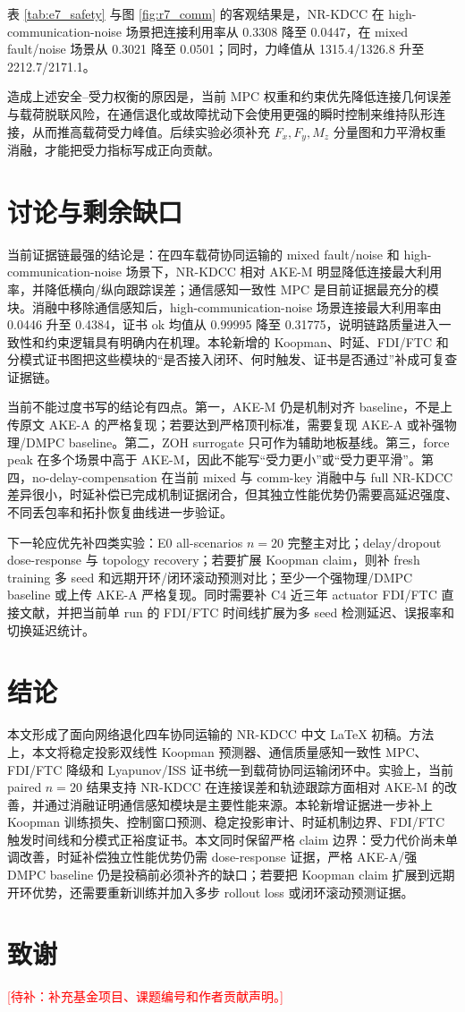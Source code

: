 \documentclass[twocolumn,3p,times,procedia]{elsarticle}
\newcommand{\todozh}[1]{\textcolor{red}{[待补：#1]}}
\newcommand{\AKE}{AKE-M}
\newcommand{\Method}{NR-KDCC}
\begin{document}
表 \ref{tab:e7_safety} 与图 \ref{fig:r7_comm} 的客观结果是，\Method{} 在 high-communication-noise 场景把连接利用率从 0.3308 降至 0.0447，在 mixed fault/noise 场景从 0.3021 降至 0.0501；同时，力峰值从 1315.4/1326.8 升至 2212.7/2171.1。

造成上述安全--受力权衡的原因是，当前 MPC 权重和约束优先降低连接几何误差与载荷脱联风险，在通信退化或故障扰动下会使用更强的瞬时控制来维持队形连接，从而推高载荷受力峰值。后续实验必须补充 $F_x,F_y,M_z$ 分量图和力平滑权重消融，才能把受力指标写成正向贡献。

\FloatBarrier

\section{讨论与剩余缺口}

当前证据链最强的结论是：在四车载荷协同运输的 mixed fault/noise 和 high-communication-noise 场景下，\Method{} 相对 \AKE{} 明显降低连接最大利用率，并降低横向/纵向跟踪误差；通信感知一致性 MPC 是目前证据最充分的模块。消融中移除通信感知后，high-communication-noise 场景连接最大利用率由 0.0446 升至 0.4384，证书 ok 均值从 0.99995 降至 0.31775，说明链路质量进入一致性和约束逻辑具有明确内在机理。本轮新增的 Koopman、时延、FDI/FTC 和分模式证书图把这些模块的“是否接入闭环、何时触发、证书是否通过”补成可复查证据链。

当前不能过度书写的结论有四点。第一，\AKE{} 仍是机制对齐 baseline，不是上传原文 AKE-A 的严格复现；若要达到严格顶刊标准，需要复现 AKE-A 或补强物理/DMPC baseline。第二，ZOH surrogate 只可作为辅助地板基线。第三，force peak 在多个场景中高于 \AKE{}，因此不能写“受力更小”或“受力更平滑”。第四，no-delay-compensation 在当前 mixed 与 comm-key 消融中与 full \Method{} 差异很小，时延补偿已完成机制证据闭合，但其独立性能优势仍需要高延迟强度、不同丢包率和拓扑恢复曲线进一步验证。

下一轮应优先补四类实验：E0 all-scenarios $n=20$ 完整主对比；delay/dropout dose-response 与 topology recovery；若要扩展 Koopman claim，则补 fresh training 多 seed 和远期开环/闭环滚动预测对比；至少一个强物理/DMPC baseline 或上传 AKE-A 严格复现。同时需要补 C4 近三年 actuator FDI/FTC 直接文献，并把当前单 run 的 FDI/FTC 时间线扩展为多 seed 检测延迟、误报率和切换延迟统计。

\section{结论}

本文形成了面向网络退化四车协同运输的 \Method{} 中文 LaTeX 初稿。方法上，本文将稳定投影双线性 Koopman 预测器、通信质量感知一致性 MPC、FDI/FTC 降级和 Lyapunov/ISS 证书统一到载荷协同运输闭环中。实验上，当前 paired $n=20$ 结果支持 \Method{} 在连接误差和轨迹跟踪方面相对 \AKE{} 的改善，并通过消融证明通信感知模块是主要性能来源。本轮新增证据进一步补上 Koopman 训练损失、控制窗口预测、稳定投影审计、时延机制边界、FDI/FTC 触发时间线和分模式正裕度证书。本文同时保留严格 claim 边界：受力代价尚未单调改善，时延补偿独立性能优势仍需 dose-response 证据，严格 AKE-A/强 DMPC baseline 仍是投稿前必须补齐的缺口；若要把 Koopman claim 扩展到远期开环优势，还需要重新训练并加入多步 rollout loss 或闭环滚动预测证据。

\section*{致谢}

\todozh{补充基金项目、课题编号和作者贡献声明。}

\FloatBarrier
\balance


\end{document}
